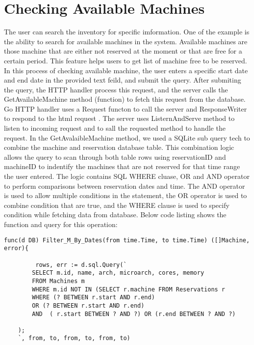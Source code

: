\section*{Checking Available Machines}
The user can search the inventory for specific imformation. One of the example is the ability to search for available machines in the system. Available machines are those machine that are either not reserved at the moment or that are free for a certain period. This feature helps users to get list of machine free to be reserved. In this process of checking available machine, the user enters a specific start date and end date in the provided text feild, and submit the query. After submiting the query, the HTTP handler process this request, and the server calls the GetAvailableMachine method (function) to fetch this request from the database. Go HTTP handler uses a Request functon to call the server and  ResponseWriter to respond to the html request \cite{Gohttp}. The server uses ListernAndServe method to listen to incoming request and to sall the requested method to handle the request. In the GetAvalaibleMachine method, we used a SQLite sub query tech to combine the machine and reservation database table. This combination logic allows the query to scan through both table rows using reservationID and machineID to indentify the machines that are not reserved for that time range the user entered. The logic contains SQL WHERE cluase, OR and AND operator to perform comparisons between reservation dates and time. \cite{ANDOR}The AND operator is used to allow multiple conditions in the statement,  the OR operator is used to combine condition that are true, and the WHERE clause is used to specify condition while fetching data from database\cite{WHEREclause}. 
\pagebreak
Below code listing shows the function and query for this operation:
\begin{lstlisting}[caption=Searching available, label=Search available machine]
func(d DB) Filter_M_By_Dates(from time.Time, to time.Time) ([]Machine, error){

         rows, err := d.sql.Query(`
		SELECT m.id, name, arch, microarch, cores, memory
		FROM Machines m
		WHERE m.id NOT IN (SELECT r.machine FROM Reservations r
		WHERE (? BETWEEN r.start AND r.end)
		OR (? BETWEEN r.start AND r.end)
		AND  ( r.start BETWEEN ? AND ?) OR (r.end BETWEEN ? AND ?)
	
	);	
	`, from, to, from, to, from, to)


\end{lstlisting}

